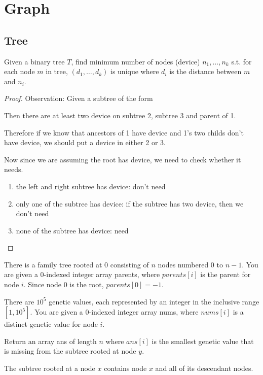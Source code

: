 \documentclass[11pt]{article}
\begin{document}
\section{Graph}
\label{sec:orgc49dbf6}
\subsection{Tree}
\label{sec:org9fe9787}
\begin{problem}
Given a binary tree \(T\), find minimum number of nodes (device) \(n_1,\dots,n_k\) s.t. for each node \(m\) in
tree, \((d_1,\dots,d_k)\) is unique where \(d_i\) is the distance between \(m\) and \(n_i\).
\end{problem}

\begin{proof}
Observation: Given a subtree of the form
\begin{center}\end{center}
Then there are at least two device on subtree 2, subtree 3 and parent of 1.

Therefore if we know that ancestors of 1 have device and 1's two childs don't have device, we
should put a device in either 2 or 3.

Now since we are assuming the root has device, we need to check whether it needs.
\begin{enumerate}
\item the left and right subtree has device: don't need
\item only one of the subtree has device: if the subtree has two device, then we don't need
\item none of the subtree has device: need
\end{enumerate}
\end{proof}

\begin{problem}
There is a family tree rooted at 0 consisting of \(n\) nodes numbered 0 to \(n - 1\). You are given a
0-indexed integer array parents, where \(parents[i]\) is the parent for node \(i\). Since node \(0\) is the
root, \(parents[0] = -1\).

There are \(10^5\) genetic values, each represented by an integer in the inclusive range \([1, 10^5]\).
You are given a 0-indexed integer array nums, where \(nums[i]\) is a distinct genetic value for
node \(i\).

Return an array ans of length \(n\) where \(ans[i]\) is the smallest genetic value that is missing from
the subtree rooted at node \(y\).

The subtree rooted at a node \(x\) contains node \(x\) and all of its descendant nodes.
\end{problem}
\end{document}
